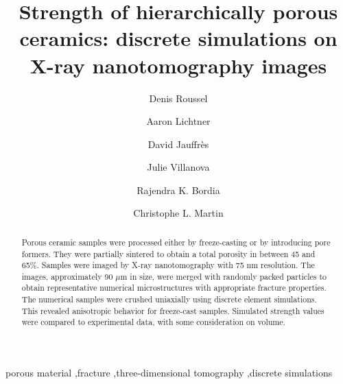 \documentclass[preprint,12pt,3p]{elsarticle}
\begin{document}
\begin{frontmatter}

\title{Strength of hierarchically porous ceramics: discrete simulations on X-ray nanotomography images}


%
%
%
%

\author[label1]{Denis Roussel}

\author[label2]{Aaron Lichtner}

\author[label1]{David Jauffr\`{e}s}
\author[label3]{Julie Villanova}

\author[label2]{Rajendra K. Bordia}

\author[label1]{Christophe L. Martin}
\address[label1]{Univ. Grenoble Alpes, CNRS, SIMAP, F-38000 Grenoble, France}
\address[label2]{Department of Materials Science and Engineering, University of Washington, Roberts Hall, Box 352120, Seattle, WA 98195, United States}
\address[label3]{ESRF – The European Synchrotron, CS 40220,
38043 Grenoble Cedex 9, France}
\begin{abstract}
Porous ceramic samples were processed either by freeze-casting or by introducing pore formers. They were partially sintered to obtain a total porosity in between 45 and 65\%. Samples were imaged by X-ray nanotomography with 75 nm resolution. The images, approximately 90 $\mu$m in size, were merged with randomly packed particles to obtain representative numerical microstructures with appropriate fracture properties. The numerical samples were crushed uniaxially using discrete element simulations. This revealed anisotropic behavior for freeze-cast samples. Simulated strength values were compared to experimental data, with some consideration on volume.  
\end{abstract}

\begin{keyword}
porous material \sep fracture \sep three-dimensional tomography \sep discrete simulations
\end{keyword}

\end{frontmatter}
\end{document}

